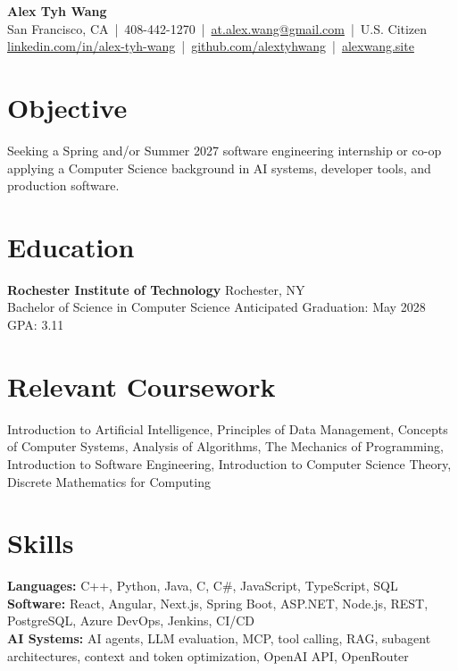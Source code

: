 \documentclass[10pt,letterpaper]{article}
\begin{document}
\begin{center}
{\Large \textbf{Alex Tyh Wang}}\\
San Francisco, CA \,|\, 408-442-1270 \,|\, \href{mailto:at.alex.wang@gmail.com}{at.alex.wang@gmail.com} \,|\, U.S. Citizen\\
\small \href{https://www.linkedin.com/in/alex-tyh-wang/}{linkedin.com/in/alex-tyh-wang} \,|\, \href{https://github.com/alextyhwang}{github.com/alextyhwang} \,|\, \href{https://alexwang.site}{alexwang.site}
\end{center}

\section*{Objective}
Seeking a Spring and/or Summer 2027 software engineering internship or co-op applying a Computer Science background in AI systems, developer tools, and production software.

\section*{Education}
\textbf{Rochester Institute of Technology} \hfill Rochester, NY\\
Bachelor of Science in Computer Science \hfill Anticipated Graduation: May 2028\\
GPA: 3.11

\section*{Relevant Coursework}
Introduction to Artificial Intelligence, Principles of Data Management, Concepts of Computer Systems, Analysis of Algorithms, The Mechanics of Programming, Introduction to Software Engineering, Introduction to Computer Science Theory, Discrete Mathematics for Computing

\section*{Skills}
\textbf{Languages:} C++, Python, Java, C, C\#, JavaScript, TypeScript, SQL\\
\textbf{Software:} React, Angular, Next.js, Spring Boot, ASP.NET, Node.js, REST, PostgreSQL, Azure DevOps, Jenkins, CI/CD\\
\textbf{AI Systems:} AI agents, LLM evaluation, MCP, tool calling, RAG, subagent architectures, context and token optimization, OpenAI API, OpenRouter
\end{document}
